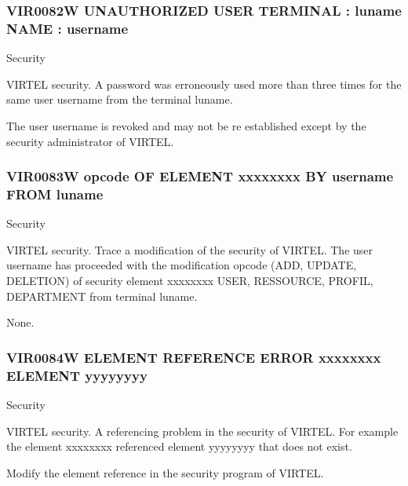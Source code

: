 \documentclass[letterpaper,10pt,english]{sphinxmanual}
\begin{document}
\subsubsection{VIR0082W UNAUTHORIZED USER TERMINAL : luname NAME : username}
\label{\detokenize{messages:vir0082w-unauthorized-user-terminal-luname-name-username}}\begin{description}
\sphinxAtStartPar
Security

\sphinxAtStartPar
VIRTEL security. A password was erroneously used more than three times for the same user username from the terminal luname.

\sphinxAtStartPar
The user username is revoked and may not be re established except by the security administrator of VIRTEL.

\end{description}


\subsubsection{VIR0083W opcode OF ELEMENT xxxxxxxx BY username FROM luname}
\label{\detokenize{messages:vir0083w-opcode-of-element-xxxxxxxx-by-username-from-luname}}\begin{description}
\sphinxAtStartPar
Security

\sphinxAtStartPar
VIRTEL security. Trace a modification of the security of VIRTEL. The user username has proceeded with the modification opcode (ADD, UPDATE, DELETION) of security element xxxxxxxx USER, RESSOURCE, PROFIL, DEPARTMENT from terminal luname.

\sphinxAtStartPar
None.

\end{description}


\subsubsection{VIR0084W ELEMENT REFERENCE ERROR xxxxxxxx ELEMENT yyyyyyyy}
\label{\detokenize{messages:vir0084w-element-reference-error-xxxxxxxx-element-yyyyyyyy}}\begin{description}
\sphinxAtStartPar
Security

\sphinxAtStartPar
VIRTEL security. A referencing problem in the security of VIRTEL. For example the element xxxxxxxx referenced element yyyyyyyy that does not exist.

\sphinxAtStartPar
Modify the element reference in the security program of VIRTEL.

\end{description}
\end{document}
